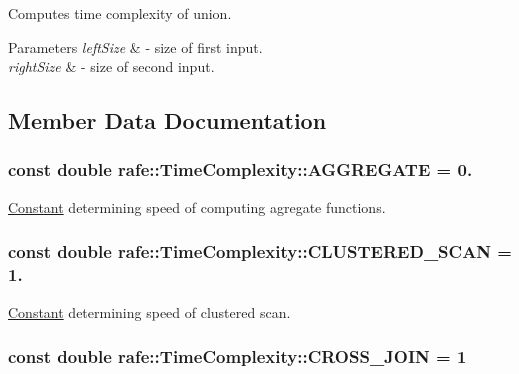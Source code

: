 Computes time complexity of union. 
\begin{DoxyParams}{Parameters}
{\em left\+Size} & -\/ size of first input. \\
\hline
{\em right\+Size} & -\/ size of second input. \\
\hline
\end{DoxyParams}


\subsection{Member Data Documentation}
\hypertarget{classrafe_1_1_time_complexity_a4a637f321994988a43c70987319deeb0}{
\subsubsection[{A\+G\+G\+R\+E\+G\+A\+T\+E}]{\setlength{\rightskip}{0pt plus 5cm}const double rafe\+::\+Time\+Complexity\+::\+A\+G\+G\+R\+E\+G\+A\+T\+E = 0.\hspace{0.3cm}{\ttfamily [static]}}}\label{classrafe_1_1_time_complexity_a4a637f321994988a43c70987319deeb0}
\hyperlink{classrafe_1_1_constant}{Constant} determining speed of computing agregate functions. \hypertarget{classrafe_1_1_time_complexity_a9801e942ee0c40046ceb756c07dc92cc}{
\subsubsection[{C\+L\+U\+S\+T\+E\+R\+E\+D\+\_\+\+S\+C\+A\+N}]{\setlength{\rightskip}{0pt plus 5cm}const double rafe\+::\+Time\+Complexity\+::\+C\+L\+U\+S\+T\+E\+R\+E\+D\+\_\+\+S\+C\+A\+N = 1.\hspace{0.3cm}{\ttfamily [static]}}}\label{classrafe_1_1_time_complexity_a9801e942ee0c40046ceb756c07dc92cc}
\hyperlink{classrafe_1_1_constant}{Constant} determining speed of clustered scan. \hypertarget{classrafe_1_1_time_complexity_af640f31f8fa80c928f0a1cd6c819443c}{
\subsubsection[{C\+R\+O\+S\+S\+\_\+\+J\+O\+I\+N}]{\setlength{\rightskip}{0pt plus 5cm}const double rafe\+::\+Time\+Complexity\+::\+C\+R\+O\+S\+S\+\_\+\+J\+O\+I\+N = 1\hspace{0.3cm}{\ttfamily [static]}}}\label{classrafe_1_1_time_complexity_af640f31f8fa80c928f0a1cd6c819443c}

